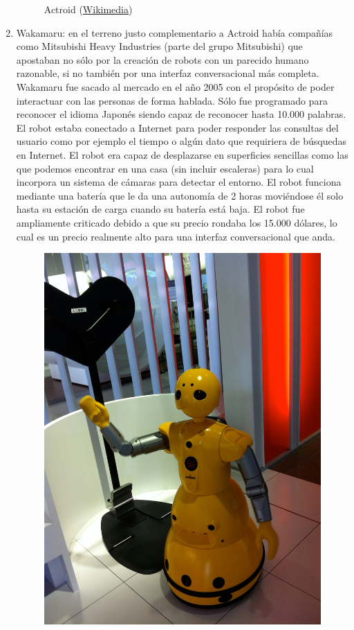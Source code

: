 \begin{enumerate}
\begin{figure}[!h]
  	\caption{Actroid (\href{https://commons.wikimedia.org/wiki/File:Actroid_3.jpg}{Wikimedia})}
  	\label{fig:actroid}
  \end{figure}
  \item Wakamaru: en el terreno justo complementario a Actroid había compañías como Mitsubishi Heavy Industries (parte del grupo Mitsubishi) que apostaban no sólo por la creación de robots con un parecido humano razonable, si no también por una interfaz conversacional más completa. Wakamaru fue sacado al mercado en el año 2005 con el propósito de poder interactuar con las personas de forma hablada. Sólo fue programado para reconocer el idioma Japonés siendo capaz de reconocer hasta 10.000 palabras. El robot estaba conectado a Internet para poder responder las consultas del usuario como por ejemplo el tiempo o algún dato que requiriera de búsquedas en Internet. El robot era capaz de desplazarse en superficies sencillas como las que podemos encontrar en una casa (sin incluir escaleras) para lo cual incorpora un sistema de cámaras para detectar el entorno. El robot funciona mediante una batería que le da una autonomía de 2 horas moviéndose él solo hasta su estación de carga cuando su batería está baja. El robot fue ampliamente criticado debido a que su precio rondaba los 15.000 dólares, lo cual es un precio realmente alto para una interfaz conversacional que anda.
  \begin{figure}[!h]
  	\centering
  	\includegraphics[scale=0.1]{./EtapaModerna/Imagenes/wakamaru.jpg}

\end{figure}
\end{enumerate}
